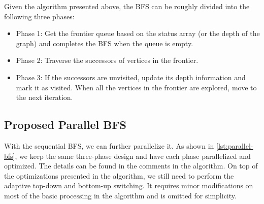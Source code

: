 \documentclass[12pt]{article} %
\begin{document}
Given the algorithm presented above, the BFS can be roughly divided into 
the following three phases:

\begin{itemize}
    \item Phase 1: Get the frontier queue based on the status array 
        (or the depth of the graph) and completes the BFS when the queue is empty. 
    \item Phase 2: Traverse the successors of vertices in the frontier. 
    \item Phase 3: If the successors are unvisited, update its depth information 
        and mark it as visited. When all the vertices in the frontier are explored, 
        move to the next iteration.
\end{itemize}

\subsection{Proposed Parallel BFS}
With the sequential BFS, we can further parallelize it. As shown in \ref{lst:parallel-bfs},  
we keep the same three-phase design and have each phase parallelized and optimized. 
The details can be found in the comments in the algorithm. On top of the optimizations presented 
in the algorithm, we still need to perform the adaptive top-down and bottom-up switching.
It requires minor modifications on most of the basic processing in the algorithm and is omitted for 
simplicity. 
\end{document}
